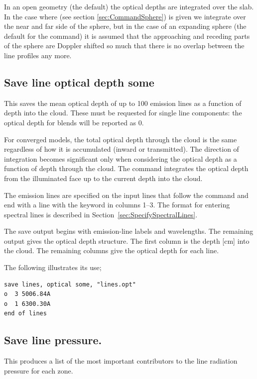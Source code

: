 In an open geometry (the default) the optical depths are integrated over the slab.
In the case where  
(see section \ref{sec:CommandSphere}) is given we integrate over 
the near and far side
of the sphere, but in the case of an expanding sphere 
(the default for the  command) it is assumed that the 
approaching and receding parts of the sphere are Doppler shifted so much 
that there is no overlap between the line profiles any more.


\subsection{Save line optical depth some}

This saves the mean optical depth of up to 100 emission lines as a
function of depth into the cloud.  These must be requested for single
line components: the optical depth for blends will be reported as 0.

For converged models, the total optical depth through the cloud is the same
regardless of how it is accumulated (inward or transmitted).
The direction of integration becomes significant only when
considering the optical depth as a function of depth through
the cloud.
The command integrates the optical depth from
the illuminated face up to the current depth into the cloud.

The emission lines are specified on the input lines that follow the
command and end with a line with the keyword  in columns 1--3.
The format for entering spectral lines is described in Section~\ref{sec:SpecifySpectralLines}.

The save output begins with emission-line labels and wavelengths.  The
remaining output gives the optical depth structure.  The first column is the
depth [cm] into the cloud.  The remaining columns give the optical depth for each line.  

The following illustrates its use;
\begin{verbatim}
save lines, optical some, "lines.opt"
o  3 5006.84A
o  1 6300.30A
end of lines
\end{verbatim}

\subsection{Save line pressure.}

This produces a list of the most important contributors to the line
radiation pressure for each zone.


